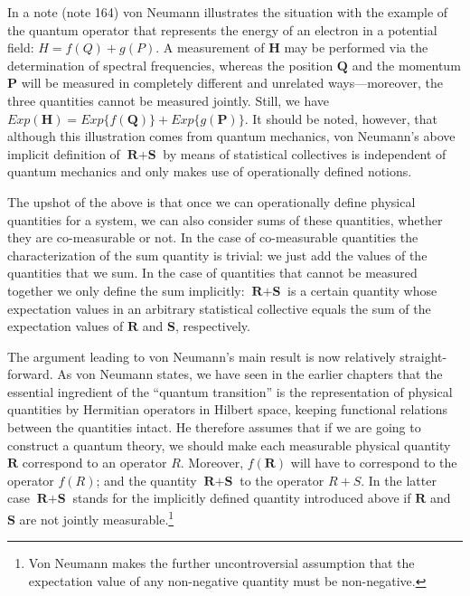 \documentclass[12pt]{article}
\begin{document}
In a note (note 164) von Neumann illustrates the situation with the example of the quantum operator that represents the energy of an electron in a potential field: $H = f(Q) + g(P)$. A measurement of $\textbf{H}$ may be performed via the determination of spectral frequencies, whereas the position $\textbf{Q}$ and the momentum $\textbf{P}$ will be measured in completely different and unrelated ways---moreover, the three quantities cannot be measured jointly. Still, we have $Exp(\textbf{H}) = Exp\{f(\textbf{Q})\} + Exp\{g(\textbf{P})\}$. It should be noted, however, that although this illustration comes from quantum mechanics, von Neumann's above implicit definition of $\textbf{R} + \textbf{S}$ by means of statistical collectives is independent of quantum mechanics and only makes use of operationally defined notions.

The upshot of the above is that once we can operationally define physical quantities for a system, we can also consider sums of these quantities, whether they are co-measurable or not. In the case of co-measurable quantities the characterization of the sum quantity is trivial: we just add the values of the quantities that we sum. In the case of quantities that cannot be measured together we only define the sum implicitly: $\textbf{R} + \textbf{S}$ is a certain quantity whose expectation values in an arbitrary statistical collective equals the sum of the expectation values of $\textbf{R}$ and $\textbf{S}$, respectively.

The argument leading to von Neumann's main result is now relatively straight-forward. As von Neumann states, we have seen in the earlier chapters that the essential ingredient of the ``quantum transition'' is the representation of physical quantities by Hermitian operators in Hilbert space, keeping functional relations between the quantities intact. He therefore assumes that if we are going to construct a quantum theory, we should make each measurable physical quantity $\textbf{R}$ correspond to an operator $R$. Moreover, $f(\textbf{R})$ will have to correspond to the operator $f(R)$; and the quantity $\textbf{R} + \textbf{S}$ to the operator $R + S$. In the latter case $\textbf{R} + \textbf{S}$ stands for the implicitly defined quantity introduced above if $\textbf{R}$ and $\textbf{S}$ are not jointly measurable.\footnote{Von Neumann makes the further uncontroversial assumption that the expectation value of any non-negative quantity must be non-negative.}
\end{document}
